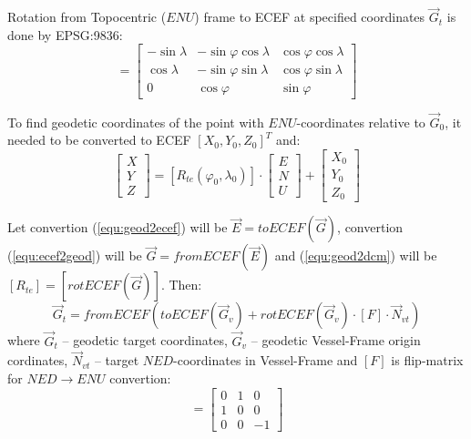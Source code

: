 \documentclass[10pt,letterpaper]{article}
\numberwithin{equation}{section}
\numberwithin{figure}{section}
\numberwithin{table}{section}
\begin{document}
Rotation from Topocentric ($ENU$) frame to ECEF at specified coordinates $\vec{G}_{t}$
is done by EPSG:9836:
\begin{equation}
    [R_{te}(\varphi, \lambda)] = \begin{bmatrix}
        -\sin \lambda & -\sin \varphi \cos \lambda & \cos \varphi \cos \lambda \\
         \cos \lambda & -\sin \varphi \sin \lambda & \cos \varphi \sin \lambda \\
         0            &  \cos \varphi              & \sin \varphi
    \end{bmatrix}
    \label{equ:geod2dcm}
\end{equation}

To find geodetic coordinates of the point with $ENU$-coordinates relative to
$\vec{G}_0$, it needed to be converted to ECEF $[ X_0, Y_0, Z_0 ]^{T}$ and:
\begin{equation}
    \begin{bmatrix}
        X \\ Y \\ Z
    \end{bmatrix} = [R_{te}(\varphi_0, \lambda_0)] \cdot \begin{bmatrix}
        E \\ N \\ U
    \end{bmatrix} + \begin{bmatrix}
        X_0 \\ Y_0 \\ Z_0
    \end{bmatrix}
\end{equation}

Let convertion (\ref{equ:geod2ecef}) will be $\vec{E} = toECEF(\vec{G})$,  convertion
(\ref{equ:ecef2geod}) will be $\vec{G} = fromECEF(\vec{E})$ and (\ref{equ:geod2dcm}) will
be $[R_{te}] = [rotECEF(\vec{G})]$. Then:
\begin{equation}
    \vec{G}_{t} = fromECEF(toECEF(\vec{G}_{v}) + rotECEF(\vec{G}_{v}) \cdot [F] \cdot \vec{N}_{vt})
    \label{equ:ned2geod}
\end{equation}
where $\vec{G}_{t}$ -- geodetic target coordinates, $\vec{G}_{v}$ -- geodetic Vessel-Frame
origin cordinates, $\vec{N}_{vt}$ -- target $NED$-coordinates in Vessel-Frame and $[F]$ is
flip-matrix for $NED \rightarrow ENU$ convertion:
\begin{equation}
    [F] = \begin{bmatrix}
        0 & 1 & 0 \\ 1 & 0 & 0 \\ 0 & 0 & -1
    \end{bmatrix}
\end{equation}
\end{document}
